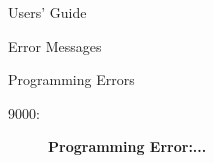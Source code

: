 \begin{chapter}{Users' Guide\label{app:user.guide}}
\begin{section}{Error Messages}
\begin{subsection}{Programming Errors}
      \begin{description}
      \item[9000:]\textbf{Programming Error:...}
      \end{description}    
      
    \end{subsection}

  \end{section}
  
    
\end{chapter}
  
